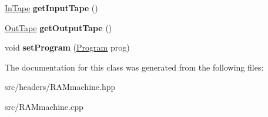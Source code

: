\begin{DoxyCompactItemize}
\item 
\hypertarget{classRAMmachine_ab366057d4a54d9d0acd2b7a89612af9a}{\hyperlink{classInTape}{In\-Tape} {\bfseries get\-Input\-Tape} ()}\label{classRAMmachine_ab366057d4a54d9d0acd2b7a89612af9a}

\item 
\hypertarget{classRAMmachine_a6a2999d602c5c88391c4dc4e39916c1d}{\hyperlink{classOutTape}{Out\-Tape} {\bfseries get\-Output\-Tape} ()}\label{classRAMmachine_a6a2999d602c5c88391c4dc4e39916c1d}

\item 
\hypertarget{classRAMmachine_ac28a9d66c715f606a3cf30259edbf115}{void {\bfseries set\-Program} (\hyperlink{classProgram}{Program} prog)}\label{classRAMmachine_ac28a9d66c715f606a3cf30259edbf115}

\end{DoxyCompactItemize}


The documentation for this class was generated from the following files\-:\begin{DoxyCompactItemize}
\item 
src/headers/R\-A\-Mmachine.\-hpp\item 
src/R\-A\-Mmachine.\-cpp\end{DoxyCompactItemize}
